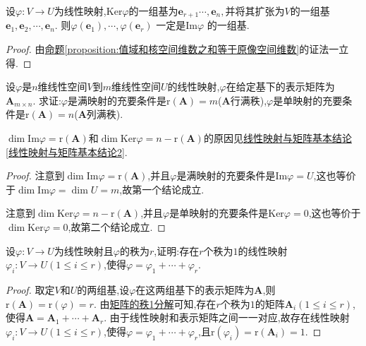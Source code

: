 \documentclass[lang=cn,newtx,10pt,scheme=chinese]{elegantbook}
\begin{document}
\begin{corollary}\label{corollary:由核的基导出值域的基}
设\(\varphi:V\to U\)为线性映射,$\mathrm{Ker}\varphi $的一组基为$\boldsymbol{e}_{r+1}\cdots ,\boldsymbol{e}_n,$并将其扩张为$V$的一组基$\boldsymbol{e}_1,\boldsymbol{e}_2,\cdots ,\boldsymbol{e}_n.$
则$\varphi \left( \boldsymbol{e}_1 \right) ,\cdots ,\varphi \left( \boldsymbol{e}_r \right)$ 一定是Im$\varphi$ 的一组基.
\end{corollary}
\begin{proof}
由\hyperref[proposition:值域和核空间维数之和等于原像空间维数]{命题\ref{proposition:值域和核空间维数之和等于原像空间维数}}的证法一立得.

\end{proof}
\begin{proposition}\label{proposition:行/列满秩矩阵对应满/单射}
设\(\varphi\)是\(n\)维线性空间\(V\)到\(m\)维线性空间\(U\)的线性映射,\(\varphi\)在给定基下的表示矩阵为\(\boldsymbol{A}_{m\times n}\). 求证:\(\varphi\)是满映射的充要条件是\(\text{r}(\boldsymbol{A}) = m\)($\boldsymbol{A}$行满秩),\(\varphi\)是单映射的充要条件是\(\text{r}(\boldsymbol{A}) = n\)($\boldsymbol{A}$列满秩).
\end{proposition}
\begin{note}
\(\dim\text{Im}\varphi=\text{r}(\boldsymbol{A})\)和\(\dim\text{Ker}\varphi=n - \text{r}(\boldsymbol{A})\)的原因见\hyperref[线性映射与矩阵基本结论2]{线性映射与矩阵基本结论\ref{线性映射与矩阵基本结论2}}.
\end{note}
\begin{proof}
注意到\(\dim\text{Im}\varphi=\text{r}(\boldsymbol{A})\),并且\(\varphi\)是满映射的充要条件是\(\text{Im}\varphi = U\),这也等价于\(\dim\text{Im}\varphi=\dim U = m\),故第一个结论成立.

注意到\(\dim\text{Ker}\varphi=n - \text{r}(\boldsymbol{A})\),并且\(\varphi\)是单映射的充要条件是\(\text{Ker}\varphi = 0\),这也等价于\(\dim\text{Ker}\varphi = 0\),故第二个结论成立.
\end{proof}

\begin{proposition}\label{proposition:线性映射的秩1分解}
设\(\varphi:V\to U\)为线性映射且\(\varphi\)的秩为\(r\),证明:存在\(r\)个秩为\(1\)的线性映射\(\varphi_i:V\to U(1\leq i\leq r)\),使得\(\varphi=\varphi_1+\cdots+\varphi_r\).
\end{proposition}
\begin{proof}
取定\(V\)和\(U\)的两组基,设\(\varphi\)在这两组基下的表示矩阵为\(\boldsymbol{A}\),则\(\text{r}(\boldsymbol{A})=\text{r}(\varphi)=r\). 由\hyperref[proposition:矩阵的秩1分解]{矩阵的秩1分解}可知,存在\(r\)个秩为\(1\)的矩阵\(\boldsymbol{A}_i(1\leq i\leq r)\),使得\(\boldsymbol{A}=\boldsymbol{A}_1+\cdots+\boldsymbol{A}_r\). 由于线性映射和表示矩阵之间一一对应,故存在线性映射\(\varphi_i:V\to U(1\leq i\leq r)\),使得\(\varphi=\varphi_1+\cdots+\varphi_r\),且\(\text{r}(\varphi_i)=\text{r}(\boldsymbol{A}_i)=1\).
\end{proof}
\end{document}
